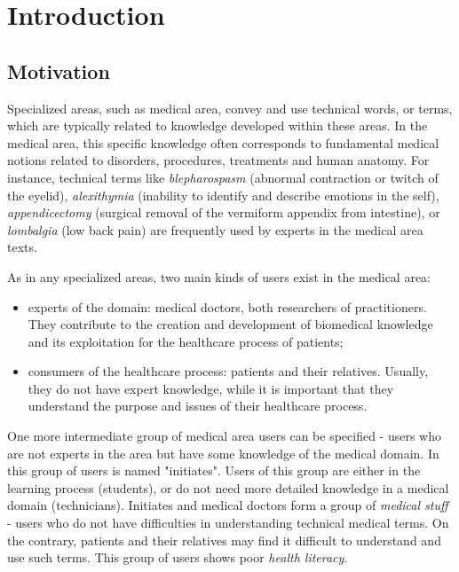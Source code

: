 \chapter{Introduction}

\section{Motivation}
Specialized areas, such as medical area, convey and use technical words, or terms, which are typically related to knowledge developed within these areas. In the medical area, this specific knowledge often corresponds to fundamental medical notions related to disorders, procedures, treatments and human anatomy. For instance, technical terms like \textit{blepharospasm} (abnormal contraction or twitch of the eyelid), \textit{alexithymia} (inability to identify and describe emotions in the self), \textit{appendicectomy} (surgical removal of the vermiform appendix from intestine), or \textit{lombalgia} (low back pain) are frequently used by experts in the medical area texts.

As in any specialized areas, two main kinds of users exist in the medical area:

\begin{itemize}
    \item experts of the domain: medical doctors, both researchers of practitioners. They contribute to the creation and development of biomedical knowledge and its exploitation for the healthcare process of patients;
    
    \item consumers of the healthcare process: patients and their relatives. Usually, they do not have expert knowledge, while it is important that they understand the purpose and issues of their healthcare process. 
\end{itemize}
One more intermediate group of medical area users can be specified - users who are not experts in the area but have some knowledge of the medical domain. In  \citep{Pearson98} this group of users is named "initiates". Users of this group are either in the learning process (students), or do not need more detailed knowledge in a medical domain (technicians). Initiates and medical doctors form a group of \textit{medical stuff} - users who do not have difficulties in understanding technical medical terms. On the contrary, patients and their relatives may find it difficult to understand and use such terms. This group of users shows poor \textit{health literacy}. 

